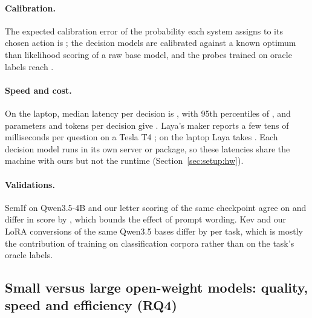 \paragraph{Calibration.} The expected calibration error of the probability each system assigns to its chosen action is ; the decision models are  calibrated against a known optimum than likelihood scoring of a raw base model, and the probes trained on oracle labels reach \result{[ECE]}. 

\paragraph{Speed and cost.} On the laptop, median latency per decision is \result{[ms by system]}, with 95th percentiles of \result{[ms]}, and parameters and tokens per decision give . Laya's maker reports a few tens of milliseconds per question on a Tesla T4 \citep{convai2026laya}; on the laptop Laya takes \result{[ms]}. Each decision model runs in its own server or package, so these latencies share the machine with ours but not the runtime (Section~\ref{sec:setup:hw}).

\paragraph{Validations.} SemIf on Qwen3.5-4B and our letter scoring of the same checkpoint agree on  and differ in score by , which bounds the effect of prompt wording. Kev and our LoRA conversions of the same Qwen3.5 bases differ by  per task, which is mostly the contribution of training on classification corpora rather than on the task's oracle labels.

\subsection{Small versus large open-weight models: quality, speed and efficiency (RQ4)}
\label{sec:res:cost}

